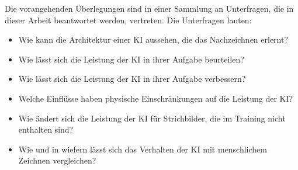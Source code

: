 Die vorangehenden Überlegungen sind in einer Sammlung an Unterfragen, die in
dieser Arbeit beantwortet werden, vertreten. Die Unterfragen lauten:
\begin{itemize}
    \item Wie kann die Architektur einer KI aussehen, die das Nachzeichnen erlernt?
    \item Wie lässt sich die Leistung der KI in ihrer Aufgabe beurteilen?
    \item Wie lässt sich die Leistung der KI in ihrer Aufgabe verbessern?
    \item Welche Einflüsse haben physische Einschränkungen auf die Leistung der KI?
    \item Wie ändert sich die Leistung der KI für Strichbilder, die im Training nicht enthalten sind?
    \item Wie und in wiefern lässt sich das Verhalten der KI mit menschlichem Zeichnen vergleichen?
\end{itemize}


